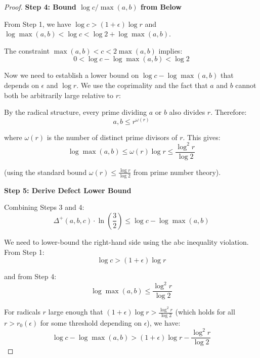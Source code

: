 \begin{proof}
\noindent \textbf{Step 4: Bound $\log c / \max(a,b)$ from Below}

From Step 1, we have $\log c > (1+\epsilon) \log r$ and $\log \max(a,b) < \log c < \log 2 + \log \max(a,b)$.

The constraint $\max(a,b) < c < 2\max(a,b)$ implies:
\begin{equation}
0 < \log c - \log \max(a,b) < \log 2
\end{equation}

Now we need to establish a lower bound on $\log c - \log \max(a,b)$ that depends on $\epsilon$ and $\log r$. We use the coprimality and the fact that $a$ and $b$ cannot both be arbitrarily large relative to $r$:

By the radical structure, every prime dividing $a$ or $b$ also divides $r$. Therefore:
\begin{equation}
a, b \leq r^{\omega(r)}
\end{equation}

where $\omega(r)$ is the number of distinct prime divisors of $r$. This gives:
\begin{equation}
\log \max(a,b) \leq \omega(r) \log r \leq \frac{\log^2 r}{\log 2}
\end{equation}

(using the standard bound $\omega(r) \leq \frac{\log r}{\log 2}$ from prime number theory).

\noindent \textbf{Step 5: Derive Defect Lower Bound}

Combining Steps 3 and 4:
\begin{equation}
\Delta^{+}(a,b,c) \cdot \ln\left(\frac{3}{2}\right) \leq \log c - \log \max(a,b)
\end{equation}

We need to lower-bound the right-hand side using the abc inequality violation. From Step 1:
\begin{equation}
\log c > (1+\epsilon) \log r
\end{equation}

and from Step 4:
\begin{equation}
\log \max(a,b) \leq \frac{\log^2 r}{\log 2}
\end{equation}

For radicals $r$ large enough that $(1+\epsilon) \log r > \frac{\log^2 r}{\log 2}$ (which holds for all $r > r_0(\epsilon)$ for some threshold depending on $\epsilon$), we have:
\begin{equation}
\log c - \log \max(a,b) > (1+\epsilon) \log r - \frac{\log^2 r}{\log 2}
\end{equation}


\end{proof}
